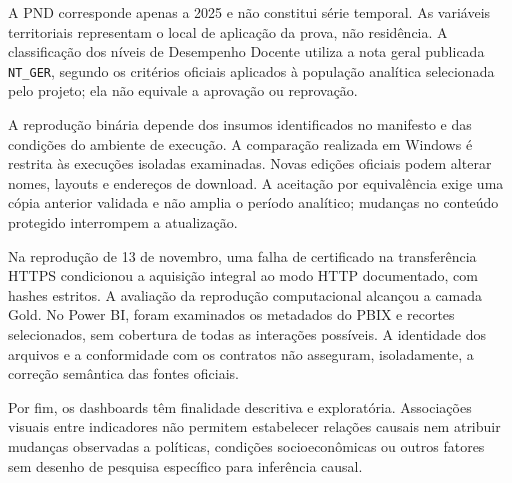 A PND corresponde apenas a 2025 e não constitui série temporal. As variáveis territoriais representam o local de aplicação da prova, não residência. A classificação dos níveis de Desempenho Docente utiliza a nota geral publicada \texttt{NT\_GER}, segundo os critérios oficiais aplicados à população analítica selecionada pelo projeto; ela não equivale a aprovação ou reprovação.

A reprodução binária depende dos insumos identificados no manifesto e das condições do ambiente de execução. A comparação realizada em Windows é restrita às execuções isoladas examinadas. Novas edições oficiais podem alterar nomes, layouts e endereços de download. A aceitação por equivalência exige uma cópia anterior validada e não amplia o período analítico; mudanças no conteúdo protegido interrompem a atualização.

Na reprodução de 13 de novembro, uma falha de certificado na transferência HTTPS condicionou a aquisição integral ao modo HTTP documentado, com hashes estritos. A avaliação da reprodução computacional alcançou a camada Gold. No Power BI, foram examinados os metadados do PBIX e recortes selecionados, sem cobertura de todas as interações possíveis. A identidade dos arquivos e a conformidade com os contratos não asseguram, isoladamente, a correção semântica das fontes oficiais.

Por fim, os dashboards têm finalidade descritiva e exploratória. Associações visuais entre indicadores não permitem estabelecer relações causais nem atribuir mudanças observadas a políticas, condições socioeconômicas ou outros fatores sem desenho de pesquisa específico para inferência causal.
